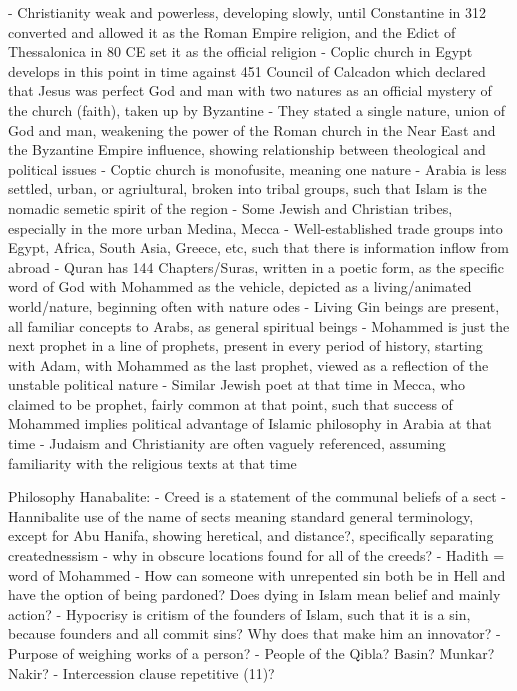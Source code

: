 \documentclass[11 pt, twoside]{article}
\begin{document}
	- Christianity weak and powerless, developing slowly, until Constantine in 312 converted and allowed it as the Roman Empire religion, and the Edict of Thessalonica in 80 CE set it as the official religion
	- Coplic church in Egypt develops in this point in time against 451 Council of Calcadon which declared that Jesus was perfect God and man with two natures as an official mystery of the church (faith), taken up by Byzantine
		- They stated a single nature, union of God and man, weakening the power of the Roman church in the Near East and the Byzantine Empire influence, showing relationship between theological and political issues
		- Coptic church is monofusite, meaning one nature
	- Arabia is less settled, urban, or agriultural, broken into tribal groups, such that Islam is the nomadic semetic spirit of the region
		- Some Jewish and Christian tribes, especially in the more urban Medina, Mecca
		- Well-established trade groups into Egypt, Africa, South Asia, Greece, etc, such that there is information inflow from abroad
- Quran has 144 Chapters/Suras, written in a poetic form, as the specific word of God with Mohammed as the vehicle, depicted as a living/animated world/nature, beginning often with nature odes
	- Living Gin beings are present, all familiar concepts to Arabs, as general spiritual beings
	- Mohammed is just the next prophet in a line of prophets, present in every period of history, starting with Adam, with Mohammed as the last prophet, viewed as a reflection of the unstable political nature
	- Similar Jewish poet at that time in Mecca, who claimed to be prophet, fairly common at that point, such that success of Mohammed implies political advantage of Islamic philosophy in Arabia at that time
	- Judaism and Christianity are often vaguely referenced, assuming familiarity with the religious texts at that time

Philosophy Hanabalite:
- Creed is a statement of the communal beliefs of a sect
- Hannibalite use of the name of sects meaning standard general terminology, except for Abu Hanifa, showing heretical, and distance?, specifically separating creatednessism
- why in obscure locations found for all of the creeds?
- Hadith = word of Mohammed
- How can someone with unrepented sin both be in Hell and have the option of being pardoned? Does dying in Islam mean belief and mainly action?
- Hypocrisy is critism of the founders of Islam, such that it is a sin, because founders and all commit sins? Why does that make him an innovator?
- Purpose of weighing works of a person?
- People of the Qibla? Basin? Munkar? Nakir?
- Intercession clause repetitive (11)?
\end{document}
